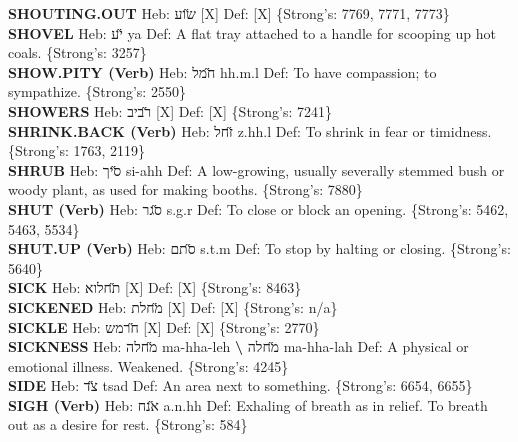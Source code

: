 {\textbf{SHOUTING.OUT} Heb: {\large\H שוע} {[}X{]} Def: {[}X{]} \{Strong's: 7769, 7771, 7773\}\hfill{}\\

\textbf{SHOVEL} Heb: {\large\H יע} ya Def: A flat tray attached to a handle for scooping up hot coals. \{Strong's: 3257\}\hfill{}\\

\textbf{SHOW.PITY (Verb)} Heb: {\large\H חמל} hh.m.l Def: To have compassion; to sympathize. \{Strong's: 2550\}\hfill{}\\

\textbf{SHOWERS} Heb: {\large\H רביב} {[}X{]} Def: {[}X{]} \{Strong's: 7241\}\hfill{}\\

\textbf{SHRINK.BACK (Verb)} Heb: {\large\H זחל} z.hh.l Def: To shrink in fear or timidness. \{Strong's: 1763, 2119\}\hfill{}\\

\textbf{SHRUB} Heb: {\large\H סיך} si-ahh Def: A low-growing, usually severally stemmed bush or woody plant, as used for making booths. \{Strong's: 7880\}\hfill{}\\

\textbf{SHUT (Verb)} Heb: {\large\H סגר} s.g.r Def: To close or block an opening. \{Strong's: 5462, 5463, 5534\}\hfill{}\\

\textbf{SHUT.UP (Verb)} Heb: {\large\H סתם} s.t.m Def: To stop by halting or closing. \{Strong's: 5640\}\hfill{}\\

\textbf{SICK} Heb: {\large\H תחלוא} {[}X{]} Def: {[}X{]} \{Strong's: 8463\}\hfill{}\\

\textbf{SICKENED} Heb: {\large\H מחלת} {[}X{]} Def: {[}X{]} \{Strong's: n/a\}\hfill{}\\

\textbf{SICKLE} Heb: {\large\H חרמש} {[}X{]} Def: {[}X{]} \{Strong's: 2770\}\hfill{}\\

\textbf{SICKNESS} Heb: {\large\H מחלה} ma-hha-leh \textbf{\textbackslash{}} {\large\H מחלה} ma-hha-lah Def: A physical or emotional illness. Weakened. \{Strong's: 4245\}\hfill{}\\

\textbf{SIDE} Heb: {\large\H צד} tsad Def: An area next to something. \{Strong's: 6654, 6655\}\hfill{}\\

\textbf{SIGH (Verb)} Heb: {\large\H אנח} a.n.hh Def: Exhaling of breath as in relief. To breath out as a desire for rest. \{Strong's: 584\}\hfill{}\\

}
